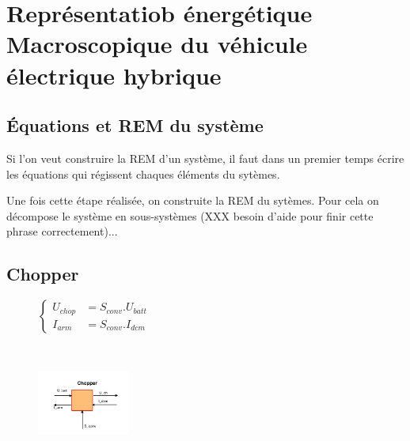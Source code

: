 \section{Représentatiob énergétique Macroscopique du véhicule électrique hybrique}

\subsection{Équations et REM du système}

Si l'on veut construire la REM d'un système, il faut dans un premier temps écrire les équations qui régissent chaques éléments du sytèmes. 

Une fois cette étape réalisée, on construite la REM du sytèmes. Pour cela on décompose le système en sous-systèmes (XXX besoin d'aide pour finir cette phrase correctement)...

\subsection{Chopper}
\vspace{-10px}
\begin{figure}[ht]
\centering
\begin{minipage}{.5\textwidth}  
\centering
$\begin{cases}
	 U_{chop} &= S_{conv}.U_{batt}\\
	I_{arm} &= S_{conv}.I_{dcm}
\end{cases}$
\end{minipage}~
\begin{minipage}{.5\textwidth}
  \centering
\includegraphics[height=80px]{images/Chopper.png}
\end{minipage}
\end{figure}
\FloatBarrier
\vspace{-20px}

